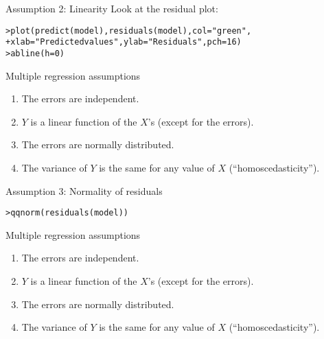 \documentclass{beamer}\usepackage[]{graphicx}\usepackage[]{color}
\makeatletter
\newcommand{\hlnum}[1]{\textcolor[rgb]{0.824,0.412,0.118}{#1}}%
\newcommand{\hlstr}[1]{\textcolor[rgb]{1,0.894,0.71}{#1}}%
\newcommand{\hlstd}[1]{\textcolor[rgb]{1,0.894,0.769}{#1}}%
\newcommand{\hlkwc}[1]{\textcolor[rgb]{0.78,0.941,0.545}{#1}}%
\newcommand{\hlkwd}[1]{\textcolor[rgb]{1,0.78,0.769}{#1}}%
\newenvironment{kframe}{%
 \def\at@end@of@kframe{}%
 \ifinner\ifhmode%
  \def\at@end@of@kframe{\end{minipage}}%
  \begin{minipage}{\columnwidth}%
 \fi\fi%
 \def\FrameCommand##1{\hskip\@totalleftmargin \hskip-\fboxsep
 \colorbox{shadecolor}{##1}\hskip-\fboxsep
     \hskip-\linewidth \hskip-\@totalleftmargin \hskip\columnwidth}%
 \MakeFramed {\advance\hsize-\width
   \@totalleftmargin\z@ \linewidth\hsize
   \@setminipage}}%
 {\par\unskip\endMakeFramed%
 \at@end@of@kframe}
\newenvironment{knitrout}{}{} %
\makeatother
\begin{document}
\begin{darkframes}
    \begin{frame}[fragile]{Assumption 2: Linearity}
      Look at the residual plot:
      \fontsm
\begin{knitrout}
\begin{kframe}
\begin{alltt}
\hlstd{> }\hlkwd{plot}\hlstd{(}\hlkwd{predict}\hlstd{(model),} \hlkwd{residuals}\hlstd{(model),} \hlkwc{col}\hlstd{=}\hlstr{"green"}\hlstd{,}
\hlstd{+ }  \hlkwc{xlab}\hlstd{=}\hlstr{"Predicted values"}\hlstd{,} \hlkwc{ylab}\hlstd{=}\hlstr{"Residuals"}\hlstd{,} \hlkwc{pch}\hlstd{=}\hlnum{16}\hlstd{)}
\hlstd{> }\hlkwd{abline}\hlstd{(}\hlkwc{h}\hlstd{=}\hlnum{0}\hlstd{)}
\end{alltt}
\end{kframe}


\end{knitrout}
    \end{frame}

    \begin{frame}{Multiple regression assumptions}
      \begin{enumerate}
        \item The errors are independent. \greencheckmark
        \item $Y$ is a linear function of the $X$'s (except for the errors). \greencheckmark
        \item The errors are normally distributed.
        \item The variance of $Y$ is the same for any value of $X$ (``homoscedasticity'').
      \end{enumerate}
    \end{frame}

    \begin{frame}[fragile]{Assumption 3: Normality of residuals}
\begin{knitrout}
\begin{kframe}
\begin{alltt}
\hlstd{> }\hlkwd{qqnorm}\hlstd{(}\hlkwd{residuals}\hlstd{(model))}
\end{alltt}
\end{kframe}


\end{knitrout}
    \end{frame}

    \begin{frame}{Multiple regression assumptions}
      \begin{enumerate}
        \item The errors are independent. \greencheckmark
        \item $Y$ is a linear function of the $X$'s (except for the errors). \greencheckmark
        \item The errors are normally distributed. \greencheckmark
        \item The variance of $Y$ is the same for any value of $X$ (``homoscedasticity'').
      \end{enumerate}
    \end{frame}


\end{darkframes}
\end{document}
